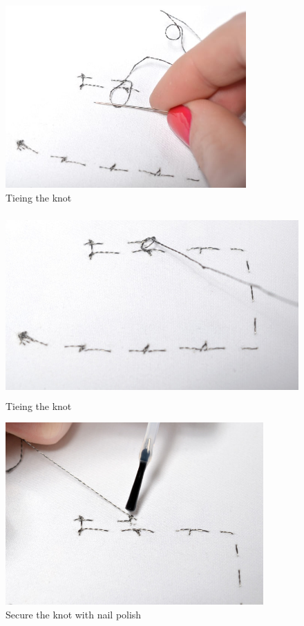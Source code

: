 \documentclass[letterpaper,twoside,12pt]{article}
\begin{document}
\begin{figure}[hbpt]\begin{centering}%
\includegraphics[height=2.75in]{flora_DSC_0120.jpg}
\caption{Tieing the knot}
\label{fig:flora_DSC_0120}
\end{centering}\end{figure}
\begin{figure}[hbpt]\begin{centering}%
\includegraphics[height=2.75in]{flora_DSC_0121.jpg}
\caption{Tieing the knot}
\label{fig:flora_DSC_0121}
\end{centering}\end{figure}
\begin{figure}[hbpt]\begin{centering}%
\includegraphics[height=2.75in]{flora_DSC_0123.jpg}
\caption{Secure the knot with nail polish}
\label{fig:flora_DSC_0123}
\end{centering}\end{figure}
\end{document}
